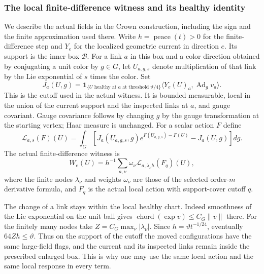 \subsubsection{The local finite-difference witness and its healthy identity}
\label{subsec:trace-pair-healthy-construction}

We describe the actual fields in the Crown construction, including the
sign and the finite approximation used there. Write $h=\operatorname{peace}(t)>0$
for the finite-difference step and $Y_e$ for the localized geometric
current in direction $e$. Its support is the inner box $\mathcal B$.
For a link $a$ in this box and a color direction obtained by conjugating
a unit color by $g\in G$, let $U_{a,g,s}$ denote multiplication of that
link by the Lie exponential of $s$ times the color. Set
\[
 J_a(U,g)=\mathbf1_{\{U\text{ healthy at }a\text{ at threshold }\vartheta/4\}}
              \langle Y_e(U)_a,\operatorname{Ad}_g v_a\rangle.
\]
This is the cutoff used in the actual witness. It is bounded measurable,
local in the union of the current support and the inspected links at
$a$, and gauge covariant. Gauge covariance follows by changing $g$ by
the gauge transformation at the starting vertex; Haar measure is unchanged.
For a scalar action $F$ define
\[
 \mathcal L_{a,s}(F)(U)=\int_G
 \left[J_a(U_{a,g,s},g)e^{F(U_{a,g,s})-F(U)}-J_a(U,g)\right]dg.
\]
The actual finite-difference witness is
\[
 W_e(U)=h^{-1}\sum_{a,\nu}\omega_\nu
                  \mathcal L_{a,\lambda_\nu h}(F_q)(U),
\]
where the finite nodes $\lambda_\nu$ and weights $\omega_\nu$ are
those of the selected order-$m$ derivative formula, and $F_q$ is the
actual local action with support-cover cutoff $q$.

The change of a link stays within the local healthy chart. Indeed smoothness
of the Lie exponential on the unit ball gives
$\operatorname{chord}(\exp v)\le C_G\|v\|$ there. For the finitely
many nodes take $Z=C_G\max_\nu|\lambda_\nu|$. Since
$h=\vartheta t^{-1/24}$, eventually $64Zh\le\vartheta$.
Thus on the support of the cutoff the moved configurations have the
same large-field flags, and the current and its inspected links remain
inside the prescribed enlarged box. This is why one may use the same
local action and the same local response in every term.

